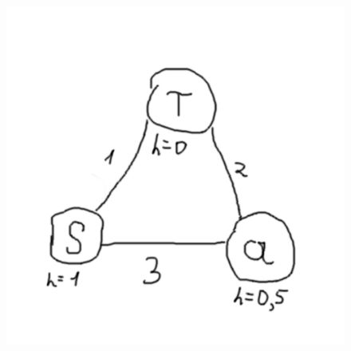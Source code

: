\documentclass{article}
\begin{document}
\begin{figure}[h]
    \centering
    \includegraphics[scale=1]{zum-cexample.png}
    \caption{}
    \label{fig:sample}
\end{figure}
\end{document}
